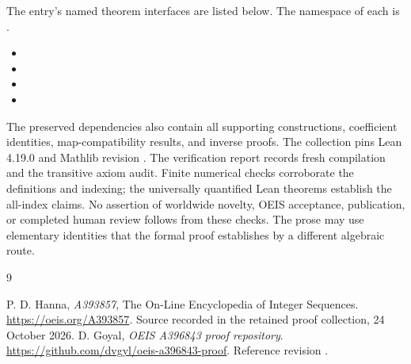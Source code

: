 \documentclass[11pt,a4paper]{article}
\theoremstyle{remark}\newtheorem{remark}[theorem]{Remark}
\begin{document}
The entry's named theorem interfaces are listed below. The namespace of
each is .
\begin{itemize}[leftmargin=1.5em,itemsep=1pt]
\item {}
\item {}
\item {}
\item {}
\end{itemize}
The preserved dependencies also contain all supporting constructions,
coefficient identities, map-compatibility results, and inverse proofs.
The collection pins Lean 4.19.0 and Mathlib revision
.
The verification report records fresh compilation and the transitive axiom
audit. Finite numerical checks corroborate the definitions and indexing;
the universally quantified Lean theorems establish the all-index claims.
No assertion of worldwide novelty, OEIS acceptance, publication, or completed
human review follows from these checks. The prose may use elementary
identities that the formal proof establishes by a different algebraic route.

\begin{thebibliography}{9}\raggedright
{} P. D. Hanna, \emph{A393857}, The On-Line Encyclopedia of Integer
Sequences. \url{https://oeis.org/A393857}. Source recorded in the retained
proof collection, 24 October 2026.
 D. Goyal, \emph{OEIS A396843 proof repository}.
\url{https://github.com/dvgyl/oeis-a396843-proof}.
Reference revision .
\end{thebibliography}
\end{document}
